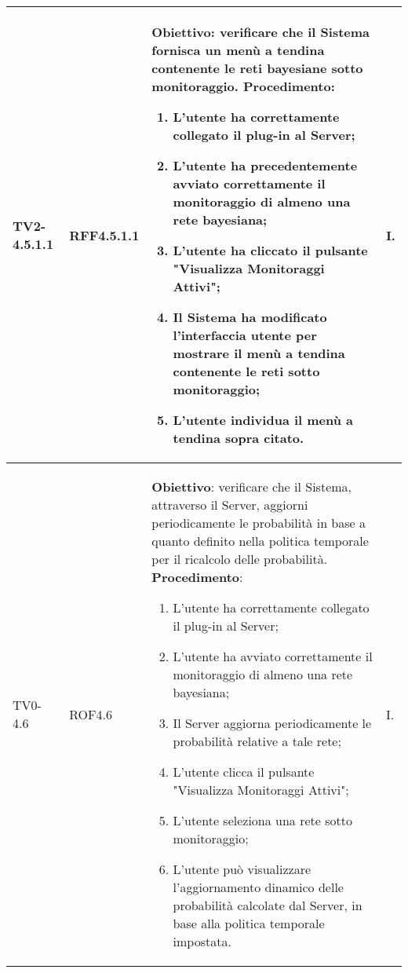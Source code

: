 \begin{longtable}{|C{.15\textwidth}|C{.13\textwidth}|m{.52\textwidth}|C{.08\textwidth}|}
TV2-4.5.1.1 & RFF4.5.1.1 &
	\textbf{Obiettivo}: verificare che il Sistema fornisca un menù a  tendina contenente le reti bayesiane sotto monitoraggio. \newline
	\textbf{Procedimento}:
	\begin{enumerate}
		\item L'utente ha correttamente collegato il plug-in al Server;
		\item L'utente ha precedentemente avviato correttamente il monitoraggio di almeno una rete bayesiana;
		\item L'utente ha cliccato il pulsante "Visualizza Monitoraggi Attivi";
		\item Il Sistema ha modificato l'interfaccia utente per mostrare il menù a tendina contenente le reti sotto monitoraggio;
		\item L'utente individua il menù a tendina sopra citato.
	\end{enumerate}
	& I. \\
\hline

TV0-4.6 & ROF4.6 &
	\textbf{Obiettivo}: verificare che il Sistema, attraverso il Server, aggiorni periodicamente le probabilità in base a quanto definito nella politica temporale per il ricalcolo delle probabilità. \newline
	\textbf{Procedimento}:
	\begin{enumerate}
		\item L'utente ha correttamente collegato il plug-in al Server;
		\item L'utente ha avviato correttamente il monitoraggio di almeno una rete bayesiana;
		\item Il Server aggiorna periodicamente le probabilità relative a tale rete;
		\item L'utente clicca il pulsante "Visualizza Monitoraggi Attivi";
		\item L'utente seleziona una rete sotto monitoraggio;
		\item L'utente può visualizzare l'aggiornamento dinamico delle probabilità calcolate dal Server, in base alla politica temporale impostata.
	\end{enumerate}
	& I. \\
\hline


\end{longtable}
